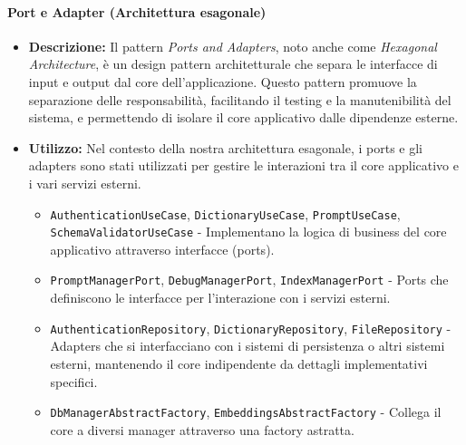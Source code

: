 \paragraph{Port e Adapter (Architettura esagonale)}
\begin{itemize}
    \item{\textbf{Descrizione:}} Il pattern \textit{Ports and Adapters}, noto anche come \textit{Hexagonal Architecture}, è un design pattern architetturale che separa le interfacce di input e output dal core dell'applicazione. Questo pattern promuove la separazione delle responsabilità, facilitando il testing e la manutenibilità del sistema, e permettendo di isolare il core applicativo dalle dipendenze esterne.
    \item{\textbf{Utilizzo:}} Nel contesto della nostra architettura esagonale, i ports e gli adapters sono stati utilizzati per gestire le interazioni tra il core applicativo e i vari servizi esterni.
    \begin{itemize}
        \item \texttt{AuthenticationUseCase}, \texttt{DictionaryUseCase}, \texttt{PromptUseCase}, \texttt{SchemaValidatorUseCase} - Implementano la logica di business del core applicativo attraverso interfacce (ports).
        \item \texttt{PromptManagerPort}, \texttt{DebugManagerPort}, \texttt{IndexManagerPort} - Ports che definiscono le interfacce per l'interazione con i servizi esterni.
        \item \texttt{AuthenticationRepository}, \texttt{DictionaryRepository}, \texttt{FileRepository} - Adapters che si interfacciano con i sistemi di persistenza o altri sistemi esterni, mantenendo il core indipendente da dettagli implementativi specifici.
        \item \texttt{DbManagerAbstractFactory}, \texttt{EmbeddingsAbstractFactory} - Collega il core a diversi manager attraverso una factory astratta.
    \end{itemize}
\end{itemize}

